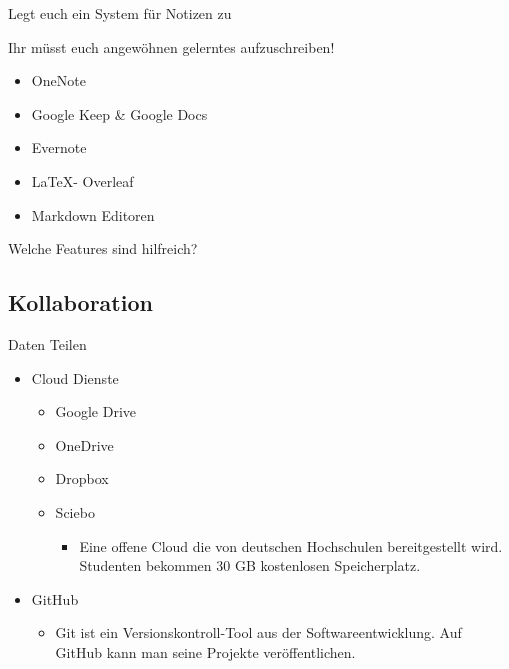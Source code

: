 \documentclass{beamer}
\begin{document}
\begin{frame}{Legt euch ein System für Notizen zu}
    \begin{block}
        Ihr müsst euch angewöhnen gelerntes aufzuschreiben!        
    \end{block}    
    \begin{itemize}
        \item OneNote
        \item Google Keep \& Google Docs
        \item Evernote
        \item \LaTeX - Overleaf
        \item Markdown Editoren    
    \end{itemize}
\end{frame}
\begin{frame}{Welche Features sind hilfreich?}
    
    
\end{frame}

\subsection{Kollaboration}

\begin{frame}{Daten Teilen}
    \begin{itemize}
        \item Cloud Dienste
            \begin{itemize}
                \item Google Drive
                \item OneDrive
                \item Dropbox
                \item Sciebo
                \begin{itemize}
                    \item Eine offene Cloud die von deutschen Hochschulen bereitgestellt wird. Studenten bekommen 30 GB kostenlosen Speicherplatz.
                \end{itemize}
            \end{itemize}
        \item GitHub 
        \begin{itemize}
            \item Git ist ein Versionskontroll-Tool aus der Softwareentwicklung. Auf GitHub kann man seine Projekte veröffentlichen.
        \end{itemize}
    \end{itemize}    
\end{frame}
\end{document}
